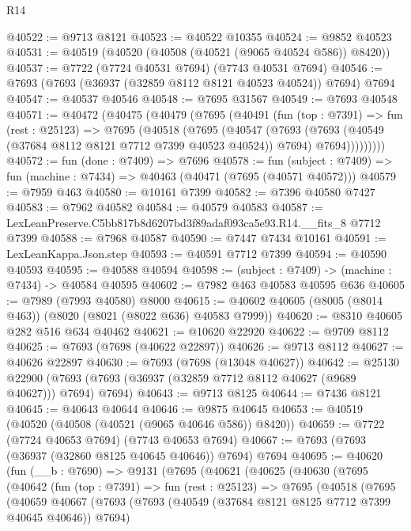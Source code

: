 \begin{lexlean}{R14}
\begin{coremodule}
@40522 := @9713 @8121
@40523 := @40522 @10355
@40524 := @9852 @40523
@40531 := @40519 (@40520 (@40508 (@40521 (@9065 @40524 @586)) @8420))
@40537 := @7722 (@7724 @40531 @7694) (@7743 @40531 @7694)
@40546 := @7693 (@7693 (@36937 (@32859 @8112 @8121 @40523 @40524)) @7694) @7694
@40547 := @40537 @40546
@40548 := @7695 @31567
@40549 := @7693 @40548
@40571 := @40472
    (@40475
      (@40479
        (@7695
          (@40491
            (fun (top : @7391) =>
            fun (rest : @25123) =>
            @7695
              (@40518
                (@7695
                  (@40547
                    (@7693
                      (@7693 (@40549 (@37684 @8112 @8121 @7712 @7399 @40523 @40524)) @7694)
                      @7694)))))))))
@40572 := fun (done : @7409) => @7696
@40578 := fun (subject : @7409) => fun (machine : @7434) => @40463 (@40471 (@7695 (@40571 @40572)))
@40579 := @7959 @463
@40580 := @10161 @7399
@40582 := @7396 @40580 @7427
@40583 := @7962 @40582
@40584 := @40579 @40583
@40587 := LexLeanPreserve.C5bb817b8d6207bd3f89adaf093ca5e93.R14.__fits_8 @7712 @7399
@40588 := @7968 @40587
@40590 := @7447 @7434 @10161
@40591 := LexLeanKappa.Json.step
@40593 := @40591 @7712 @7399
@40594 := @40590 @40593
@40595 := @40588 @40594
@40598 := (subject : @7409) -> (machine : @7434) -> @40584 @40595
@40602 := @7982 @463 @40583 @40595 @636
@40605 := @7989 (@7993 @40580) @8000
@40615 := @40602 @40605 (@8005 (@8014 @463)) (@8020 (@8021 (@8022 @636) @40583 @7999))
@40620 := @8310 @40605 @282 @516 @634 @40462
@40621 := @10620 @22920
@40622 := @9709 @8112
@40625 := @7693 (@7698 (@40622 @22897))
@40626 := @9713 @8112
@40627 := @40626 @22897
@40630 := @7693 (@7698 (@13048 @40627))
@40642 := @25130
    @22900
    (@7693 (@7693 (@36937 (@32859 @7712 @8112 @40627 (@9689 @40627))) @7694) @7694)
@40643 := @9713 @8125
@40644 := @7436 @8121
@40645 := @40643 @40644
@40646 := @9875 @40645
@40653 := @40519 (@40520 (@40508 (@40521 (@9065 @40646 @586)) @8420))
@40659 := @7722 (@7724 @40653 @7694) (@7743 @40653 @7694)
@40667 := @7693 (@7693 (@36937 (@32860 @8125 @40645 @40646)) @7694) @7694
@40695 := @40620
    (fun (__b : @7690) =>
    @9131
      (@7695
        (@40621
          (@40625
            (@40630
              (@7695
                (@40642
                  (fun (top : @7391) =>
                  fun (rest : @25123) =>
                  @7695
                    (@40518
                      (@7695
                        (@40659
                          @40667
                          (@7693
                            (@7693 (@40549 (@37684 @8121 @8125 @7712 @7399 @40645 @40646)) @7694)

\end{coremodule}
\end{lexlean}
